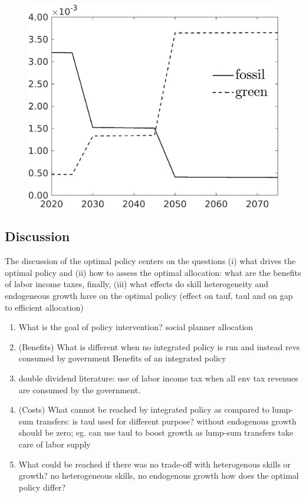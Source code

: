 \begin{figure}[h!!]
\begin{minipage}[]{0.32\textwidth}
	\end{minipage}
	\begin{minipage}[]{0.32\textwidth}
		\includegraphics[width=1\textwidth]{../../codding_model/own_basedOnFried/optimalPol_elastS_DisuSci/figures/all_1705/SingleJointTOT_OPT_T_NoTaus_labourInp_spillover0_sep1_BN0_ineq0_red0_etaa0.79_lgd1.png}
	\end{minipage}
\end{figure} 



\subsection{Discussion}\label{subsec:dis}
The discussion of the optimal policy centers on the questions (i) what drives the optimal policy and (ii) how to assess the optimal allocation: what are the benefits of labor income taxes, finally, (iii) what effects do skill heterogeneity and endogeneous growth have on the optimal policy (effect on tauf, taul and on gap to efficient allocation)
\begin{enumerate}
	\item What is the goal of policy intervention? \ar social planner allocation
	\item (Benefits) What is different when no integrated policy is run and instead revs consumed by government \ar Benefits of an integrated policy
	\item double dividend literature: use of labor income tax when all env tax revenues are consumed by the government.
	\item (Costs) What cannot be reached by integrated policy as compared to lump-sum transfers: is taul used for different purpose? without endogenous growth should be zero; eg. can use taul to boost growth as lump-sum transfers take care of labor supply 
	\item What could be reached if there was no trade-off with heterogenous skills or growth? no heterogeneous skills, no endogenous growth \ar how does the optimal policy differ?
\end{enumerate}


